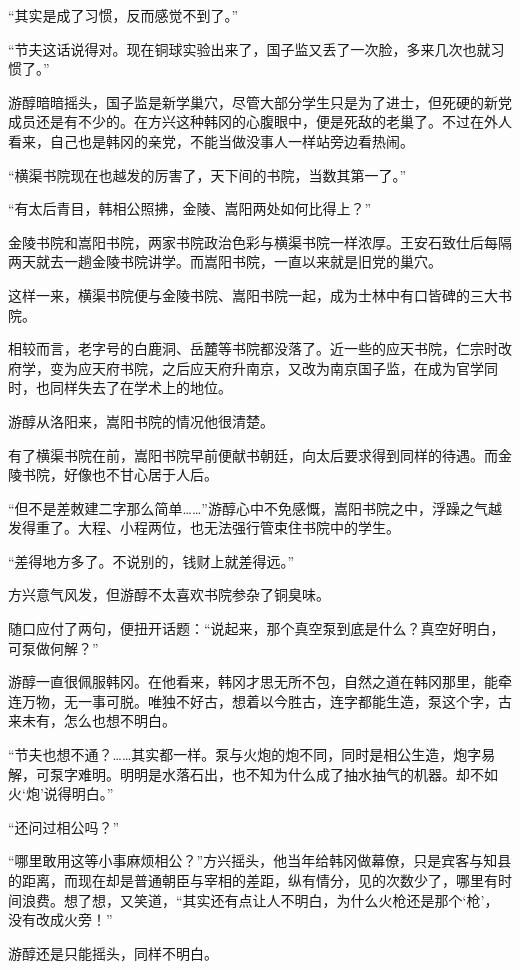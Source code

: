 “其实是成了习惯，反而感觉不到了。”

“节夫这话说得对。现在铜球实验出来了，国子监又丢了一次脸，多来几次也就习惯了。”

游醇暗暗摇头，国子监是新学巢穴，尽管大部分学生只是为了进士，但死硬的新党成员还是有不少的。在方兴这种韩冈的心腹眼中，便是死敌的老巢了。不过在外人看来，自己也是韩冈的亲党，不能当做没事人一样站旁边看热闹。

“横渠书院现在也越发的厉害了，天下间的书院，当数其第一了。”

“有太后青目，韩相公照拂，金陵、嵩阳两处如何比得上？”

金陵书院和嵩阳书院，两家书院政治色彩与横渠书院一样浓厚。王安石致仕后每隔两天就去一趟金陵书院讲学。而嵩阳书院，一直以来就是旧党的巢穴。

这样一来，横渠书院便与金陵书院、嵩阳书院一起，成为士林中有口皆碑的三大书院。

相较而言，老字号的白鹿洞、岳麓等书院都没落了。近一些的应天书院，仁宗时改府学，变为应天府书院，之后应天府升南京，又改为南京国子监，在成为官学同时，也同样失去了在学术上的地位。

游醇从洛阳来，嵩阳书院的情况他很清楚。

有了横渠书院在前，嵩阳书院早前便献书朝廷，向太后要求得到同样的待遇。而金陵书院，好像也不甘心居于人后。

“但不是差敇建二字那么简单……”游醇心中不免感慨，嵩阳书院之中，浮躁之气越发得重了。大程、小程两位，也无法强行管束住书院中的学生。

“差得地方多了。不说别的，钱财上就差得远。”

方兴意气风发，但游醇不太喜欢书院参杂了铜臭味。

随口应付了两句，便扭开话题：“说起来，那个真空泵到底是什么？真空好明白，可泵做何解？”

游醇一直很佩服韩冈。在他看来，韩冈才思无所不包，自然之道在韩冈那里，能牵连万物，无一事可脱。唯独不好古，想着以今胜古，连字都能生造，泵这个字，古来未有，怎么也想不明白。

“节夫也想不通？……其实都一样。泵与火炮的炮不同，同时是相公生造，炮字易解，可泵字难明。明明是水落石出，也不知为什么成了抽水抽气的机器。却不如火‘炮’说得明白。”

“还问过相公吗？”

“哪里敢用这等小事麻烦相公？”方兴摇头，他当年给韩冈做幕僚，只是宾客与知县的距离，而现在却是普通朝臣与宰相的差距，纵有情分，见的次数少了，哪里有时间浪费。想了想，又笑道，“其实还有点让人不明白，为什么火枪还是那个‘枪’，没有改成火旁！”

游醇还是只能摇头，同样不明白。

